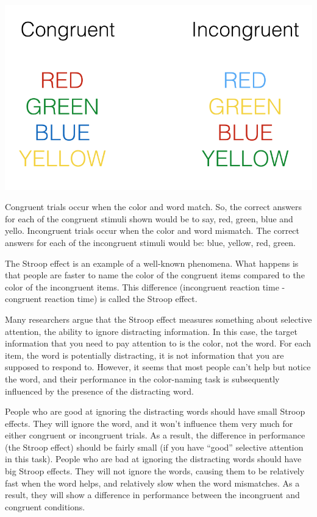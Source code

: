 \documentclass[
]{book}
\begin{document}
\includegraphics{figures/Stroop.png}

Congruent trials occur when the color and word match. So, the correct answers for each of the congruent stimuli shown would be to say, red, green, blue and yello. Incongruent trials occur when the color and word mismatch. The correct answers for each of the incongruent stimuli would be: blue, yellow, red, green.

The Stroop effect is an example of a well-known phenomena. What happens is that people are faster to name the color of the congruent items compared to the color of the incongruent items. This difference (incongruent reaction time - congruent reaction time) is called the Stroop effect.

Many researchers argue that the Stroop effect measures something about selective attention, the ability to ignore distracting information. In this case, the target information that you need to pay attention to is the color, not the word. For each item, the word is potentially distracting, it is not information that you are supposed to respond to. However, it seems that most people can't help but notice the word, and their performance in the color-naming task is subsequently influenced by the presence of the distracting word.

People who are good at ignoring the distracting words should have small Stroop effects. They will ignore the word, and it won't influence them very much for either congruent or incongruent trials. As a result, the difference in performance (the Stroop effect) should be fairly small (if you have ``good'' selective attention in this task). People who are bad at ignoring the distracting words should have big Stroop effects. They will not ignore the words, causing them to be relatively fast when the word helps, and relatively slow when the word mismatches. As a result, they will show a difference in performance between the incongruent and congruent conditions.
\end{document}
